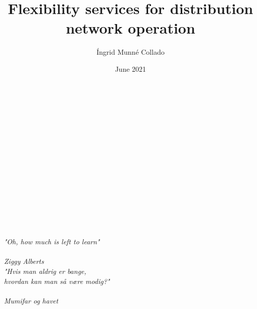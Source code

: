 \documentclass{Classe/PhDCITCEA_web}
\title{Flexibility services for distribution network operation}
\author{\'Ingrid Munn\'e Collado}
\date{June 2021}
\begin{document}
\cleardoubleemptypage


\maketitle

\cleardoubleemptypage

%

\clearpage
$ $
\\$ $
\\$ $
\\$ $
\\$ $
\\$ $
\\$ $
\\$ $
\\$ $
\\$ $
\\$ $
\\$ $
\\$ $

\begin{Large}
{\raggedleft
\textit{"Oh, how much is left to learn"\\ ~ \\ Ziggy Alberts\\}}
\vspace{2cm}
{\raggedleft
\textit{"Hvis man aldrig er bange,\\ hvordan kan man s{\aa} v{\ae}re modig?"\\ ~ \\Mumifar og havet\\}}
\vspace{2cm}



\end{Large}
\clearpage
\end{document}
